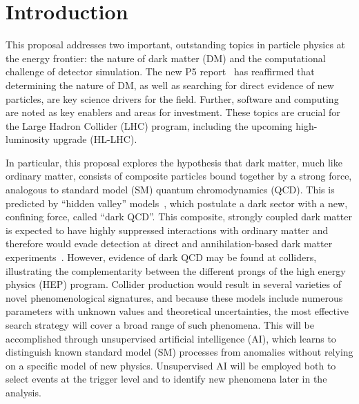 \section{Introduction}\label{sec:intro}

This proposal addresses two important, outstanding topics in particle physics at the energy frontier:
the nature of dark matter (DM) and the computational challenge of detector simulation.
The new P5 report~\cite{P5:2023} has reaffirmed that determining the nature of DM,
as well as searching for direct evidence of new particles, are key science drivers for the field.
Further, software and computing are noted as key enablers and areas for investment.
These topics are crucial for the Large Hadron Collider (LHC) program,
including the upcoming high-luminosity upgrade (HL-LHC).

In particular, this proposal explores the hypothesis that dark matter, much like ordinary matter,
consists of composite particles bound together by a strong force, analogous to standard model (SM) quantum chromodynamics (QCD).
This is predicted by ``hidden valley'' models~\cite{Strassler:2006im}, which postulate a dark sector with a new, confining force, called ``dark QCD''.
This composite, strongly coupled dark matter is expected to have highly suppressed interactions with ordinary matter
and therefore would evade detection at direct and annihilation-based dark matter experiments~\cite{Cohen:2017pzm,Petraki:2013wwa}.
However, evidence of dark QCD may be found at colliders, illustrating the complementarity between the different prongs of the high energy physics (HEP) program.
Collider production would result in several varieties of novel phenomenological signatures,
and because these models include numerous parameters with unknown values and theoretical uncertainties, the most effective search strategy will cover a broad range of such phenomena.
This will be accomplished through unsupervised artificial intelligence (AI), which learns to distinguish known standard model (SM) processes from anomalies
without relying on a specific model of new physics.
Unsupervised AI will be employed both to select events at the trigger level and to identify new phenomena later in the analysis.

